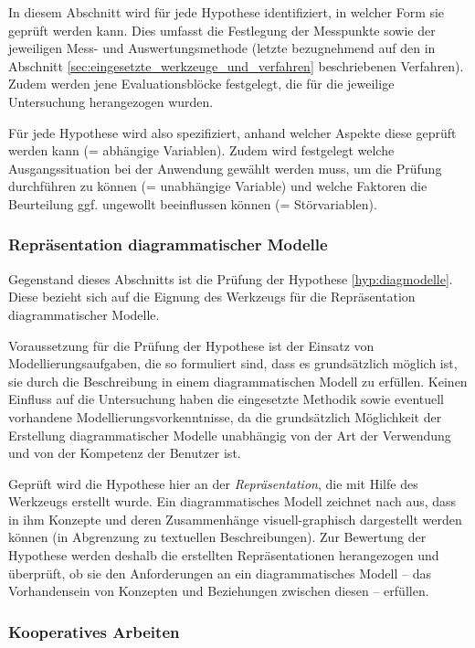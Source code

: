 In diesem Abschnitt wird für jede Hypothese identifiziert, in welcher Form sie geprüft werden kann. Dies umfasst die Festlegung der Messpunkte sowie der jeweiligen Mess- und Auswertungsmethode (letzte bezugnehmend auf den in Abschnitt \ref{sec:eingesetzte_werkzeuge_und_verfahren} beschriebenen Verfahren). Zudem werden jene Evaluationsblöcke festgelegt, die für die jeweilige Untersuchung herangezogen wurden.

Für jede Hypothese wird also spezifiziert, anhand welcher Aspekte diese geprüft werden kann (= abhängige Variablen). Zudem wird festgelegt welche Ausgangssituation bei der Anwendung gewählt werden muss, um die Prüfung durchführen zu können (= unabhängige Variable) und welche Faktoren die Beurteilung ggf. ungewollt beeinflussen können (= Störvariablen).

\subsubsection{Repräsentation diagrammatischer Modelle} %
\label{ssub:repräsentation}

Gegenstand dieses Abschnitts ist die Prüfung der Hypothese \ref{hyp:diagmodelle}. Diese bezieht sich auf die Eignung des Werkzeugs für die Repräsentation diagrammatischer Modelle.

Voraussetzung für die Prüfung der Hypothese ist der Einsatz von Modellierungsaufgaben, die so formuliert sind, dass es grundsätzlich möglich ist, sie durch die Beschreibung in einem diagrammatischen Modell zu erfüllen. Keinen Einfluss auf die Untersuchung haben die eingesetzte Methodik sowie eventuell vorhandene Modellierungsvorkenntnisse, da die grundsätzlich Möglichkeit der Erstellung diagrammatischer Modelle unabhängig von der Art der Verwendung und von der Kompetenz der Benutzer ist. 

Geprüft wird die Hypothese hier an der \emph{Repräsentation}, die mit Hilfe des Werkzeugs erstellt wurde. Ein diagrammatisches Modell zeichnet nach \citep{Larkin87} aus, dass in ihm Konzepte und deren Zusammenhänge visuell-graphisch dargestellt werden können (in Abgrenzung zu textuellen Beschreibungen). Zur Bewertung der Hypothese werden deshalb die erstellten Repräsentationen herangezogen und überprüft, ob sie den Anforderungen an ein diagrammatisches Modell -- das Vorhandensein von Konzepten und Beziehungen zwischen diesen -- erfüllen.


\subsubsection{Kooperatives Arbeiten} %
\label{ssub:kollaboratives_arbeiten}

